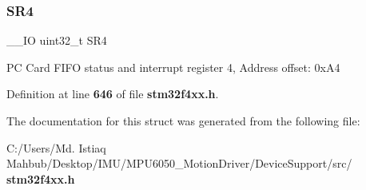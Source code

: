 \mbox{\label{structFSMC__Bank4__TypeDef_a8218d6e11dae5d4468c69303dec0b4fc}} 
\subsubsection{S\+R4}
{\footnotesize\ttfamily \+\_\+\+\_\+\+IO uint32\+\_\+t S\+R4}

PC Card F\+I\+FO status and interrupt register 4, Address offset\+: 0x\+A4 

Definition at line \textbf{ 646} of file \textbf{ stm32f4xx.\+h}.



The documentation for this struct was generated from the following file\+:\begin{DoxyCompactItemize}
\item 
C\+:/\+Users/\+Md. Istiaq Mahbub/\+Desktop/\+I\+M\+U/\+M\+P\+U6050\+\_\+\+Motion\+Driver/\+Device\+Support/src/\textbf{ stm32f4xx.\+h}\end{DoxyCompactItemize}
